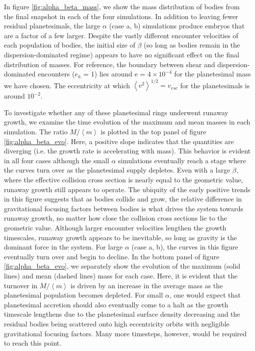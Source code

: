 \documentclass[twocolumn,linenumbers]{aastex63}
\begin{document}
In figure \ref{fig:alpha_beta_mass}, we show the mass distribution of bodies from the final snapshot in each of the four simulations. In addition to 
leaving fewer residual planetesimals, the large $\alpha$ (case a, b) simulations produce embryos that are a factor of a few larger. Despite the 
vastly different encounter velocities of each population of bodies, the initial size of $\beta$ (so long as bodies remain in the dispersion-dominated regime) 
appears to have no significant effect on the final distribution of masses. For reference, the boundary between shear and dispersion-dominated 
encounters ($e_{h}$ = 1) lies around e = $4 \times 10^{-4}$ for the planetesimal mass we have chosen. The eccentricity at which $\left< v^{2} \right>^{1/2} = 
v_{esc}$ for the planetesimals is around $10^{-2}$.

To investigate whether any of these planetesimal rings underwent
runaway growth, we examine the time evolution of the maximum and mean
masses in each simulation. The ratio $M/\left< m \right>$ is plotted
in the top panel of figure \ref{fig:alpha_beta_evo}. Here, a positive slope
indicates that the quantities are diverging (i.e.
the growth rate is accelerating with mass). This behavior is
evident in all four cases although the small $\alpha$ simulations eventually reach a stage where the curves
 turn over as the planetesimal supply depletes. Even with a large
$\beta$, where the effective collision cross section is
 nearly equal to the geometric value, runaway growth still appears to
operate. The ubiquity of the early positive trends in this figure suggests
that as bodies collide and grow, the
relative difference in gravitational focusing factors between bodies
is what drives the system towards runaway
growth, no matter how close the collision cross sections lie to the geometric value.
Although larger encounter velocities lengthen the growth
timescales, runaway growth appears to be inevitable, so long as
gravity is the dominant force in the system. For large $\alpha$
(case a, b), the curves in this figure eventually turn over and begin to decline.
In the bottom panel of figure \ref{fig:alpha_beta_evo}, we separately show the evolution of
the maximum (solid lines) and mean (dashed lines) mass for each case. Here, it is evident
that the turnover in $M/\left< m \right>$ is
driven by an increase in the average mass as the planetesimal population
becomes depleted. For small $\alpha$, one would expect that planetesimal accretion should also eventually come to a halt as
the growth timescale lengthens due to the planetesimal surface density decreasing and the residual bodies being scattered onto high
eccentricity orbits with negligible gravitational focusing factors. Many more timesteps, however, would be required to reach this point.
\end{document}
